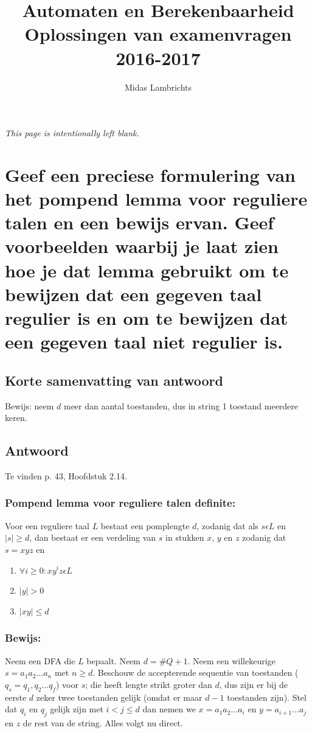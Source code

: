 \documentclass{article}
\title{Automaten en Berekenbaarheid \\ Oplossingen van examenvragen 2016-2017}
\author{Midas Lambrichts}
\date{}
\begin{document}
\maketitle
 
\newpage
\begin{center}
   \textit{This page is intentionally left blank.}
\end{center}
\newpage
\tableofcontents
\newpage
\section{Geef een preciese formulering van het pompend lemma voor reguliere talen en een bewijs ervan. Geef voorbeelden waarbij je laat zien hoe je dat lemma gebruikt om te bewijzen dat een gegeven taal regulier is en om te bewijzen dat een gegeven taal niet regulier is.}
    \subsection{Korte samenvatting van antwoord}    
        Bewijs: neem $d$ meer dan aantal toestanden, dus in string 1 toestand meerdere keren.
    \subsection{Antwoord}
        Te vinden p. 43, Hoofdstuk 2.14.
        \subsubsection{Pompend lemma voor reguliere talen definite:}
        Voor een reguliere taal $L$ bestaat een pomplengte $d$, zodanig dat als $s \epsilon L$ en $\vert s \vert \geq d$, dan bestaat er een verdeling van $s$ in stukken $x$, $y$ en $z$ zodanig dat $s = xyz$ en
        \begin{enumerate}
            \item $\forall i \geq 0: xy^iz \epsilon L$
            \item $\vert y \vert > 0$
            \item $\vert xy \vert \leq d$
        \end{enumerate}
        \subsubsection{Bewijs:}
        Neem een DFA die $L$ bepaalt. Neem $d = \#Q + 1$.
        Neem een willekeurige $s = a_1a_2...a_n$ met $n \geq d$. Beschouw de accepterende sequentie van toestanden ($q_s = q_1, q_2...q_f $) voor $s$; die heeft lengte strikt groter dan $d$, dus zijn er bij de eerste $d$ zeker twee toestanden gelijk (omdat er maar $d - 1$ toestanden zijn). Stel dat $q_i$ en $q_j$ gelijk zijn met $i < j \leq d$ dan nemen we $x = a_1a_2...a_i$ en $y = a_{i+1}...a_j$ en $z$ de rest van de string. Alles volgt nu direct. 
\end{document}
